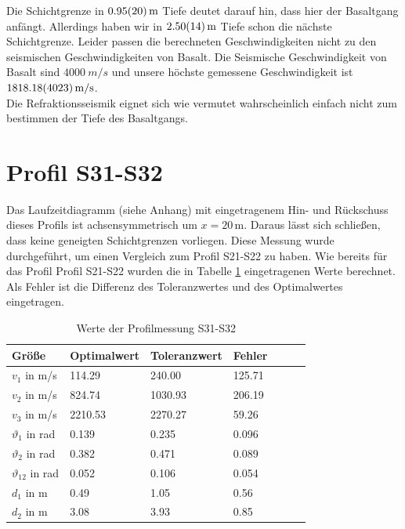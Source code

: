 
Die Schichtgrenze in $\SI{0.95 \pm 0.20}{m}$  Tiefe deutet darauf hin, dass hier der Basaltgang anfängt. Allerdings haben wir in $\SI{2.50 \pm 0.14}{m}$ Tiefe schon die nächste Schichtgrenze. Leider passen die berechneten Geschwindigkeiten nicht zu den seismischen Geschwindigkeiten von Basalt. Die Seismische Geschwindigkeit von Basalt sind $\SI{4000}{m/s}$ und unsere höchste gemessene Geschwindigkeit ist $\SI{1818.18 \pm 40.23}{m/s}$.\\
Die Refraktionsseismik eignet sich wie vermutet wahrscheinlich einfach nicht zum bestimmen der Tiefe des Basaltgangs. 


\section{Profil S31-S32}

Das Laufzeitdiagramm (siehe Anhang) mit eingetragenem Hin- und Rückschuss dieses Profils ist achsensymmetrisch um $x=20$\,m. Daraus lässt sich schließen, dass keine geneigten Schichtgrenzen vorliegen.
Diese Messung wurde durchgeführt, um einen Vergleich zum Profil S21-S22 zu haben.
Wie bereits für das Profil Profil S21-S22 wurden die in Tabelle \ref{tab:S31-S32} eingetragenen Werte berechnet. Als Fehler ist die Differenz des Toleranzwertes und des Optimalwertes eingetragen.\\



\begin{table}[!ht]
\centering
\caption{Werte der Profilmessung S31-S32}
\label{tab:S31-S32}
\begin{tabular}{lllllll}
\toprule
Größe   & Optimalwert   & Toleranzwert   & Fehler \\
\midrule
$v_1$ in m/s & 114.29 & 240.00 &  125.71\\
$v_2$ in m/s & 824.74 & 1030.93 & 206.19 \\
$v_3$ in m/s & 2210.53 & 2270.27 & 59.26 \\
$\vartheta_1$ in rad & 0.139 & 0.235 & 0.096  \\
$\vartheta_2$ in rad & 0.382 & 0.471 & 0.089 \\
$\vartheta_{12}$ in rad & 0.052 & 0.106 & 0.054 \\
$d_1$ in m & 0.49 & 1.05 & 0.56 \\
$d_2$ in m & 3.08 & 3.93 & 0.85 \\

\bottomrule
\end{tabular}
\end{table}

